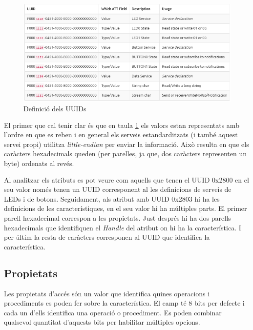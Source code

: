 \begin{figure}[h!]
	\begin{center}
		\includegraphics[width=\textwidth]{./images/Project_0_UUID.png}
		\caption{Definició dels UUIDs}
	\end{center}
	\label{project0_table}
\end{figure}

El primer que cal tenir clar és que en taula \ref{project0_table} els valors estan representats amb l'ordre en que es reben i en general els serveis estandarditzats (i també aquest servei propi) utilitza \textit{little-endian} per enviar la informació.
Això resulta en que els caràcters hexadecimals queden (per parelles, ja que, dos caràcters representen un byte) ordenats al revés.

Al analitzar els atributs es pot veure com aquells que tenen el UUID 0x2800 en el seu valor només tenen un UUID corresponent al les definicions de serveis de LEDs i de botons.
Seguidament, als atribut amb UUID 0x2803 hi ha les definicions de les característiques, en el seu valor hi ha múltiples parts.
El primer parell hexadecimal correspon a les propietats. Just després hi ha dos parells hexadecimals que identifiquen el \textit{Handle} del atribut on hi ha la característica.
I per últim la resta de caràcters corresponen al UUID que identifica la característica.

\subsection{Propietats}
\label{sec:properties}
Les propietats d'accés són un valor que identifica quines operacions i procediments es poden fer sobre la característica.
El camp té 8 bits per defecte i cada un d'ells identifica una operació o procediment.
Es poden combinar qualsevol quantitat d'aquests bits per habilitar múltiples opcions.

